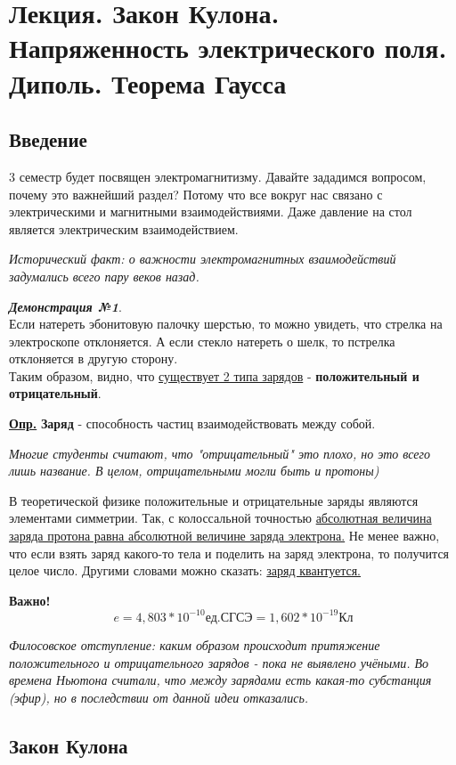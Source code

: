 \newpage
\section{Лекция. Закон Кулона. Напряженность электрического поля. Диполь. Теорема Гаусса}
\subsection{Введение}
3 семестр будет посвящен электромагнитизму. Давайте зададимся вопросом, почему это важнейший раздел? Потому что все вокруг нас связано с электрическими и магнитными взаимодействиями. Даже давление на стол является электрическим взаимодействием. 

\textit{Исторический факт: о важности электромагнитных взаимодействий задумались всего пару веков назад.}

\large
\textbf{\textit{Демонстрация №1}}.\\
\normalsize
Если натереть эбонитовую палочку шерстью, то можно увидеть, что стрелка на электроскопе отклоняется. А если стекло натереть о шелк, то пстрелка отклоняется в другую сторону.\\
Таким образом, видно, что \underline{существует 2 типа зарядов} - \textbf{положительный и отрицательный}.

\colorbox{faded}{\underline{\textbf{Опр.}}} \textbf{Заряд} - способность частиц взаимодействовать между собой.

\textit{Многие студенты считают, что "отрицательный" это плохо, но это всего лишь название. В целом, отрицательными могли быть и протоны)}

В теоретической физике положительные и отрицательные заряды являются элементами симметрии. Так, с колоссальной точностью \underline{абсолютная величина заряда протона равна абсолютной величине заряда электрона.} Не менее важно, что если взять заряд какого-то тела и поделить на заряд электрона, то получится целое число. Другими словами можно сказать: \underline{заряд квантуется.}

\textbf{Важно!} 
$$e = 4,803*10^{-10} \text{ед.СГСЭ} = 1,602*10^{-19} \text{Кл}$$

\textit{Филосовское отступление: каким образом происходит притяжение положительного и отрицательного зарядов - пока не выявлено учёными. Во времена Ньютона считали, что между зарядами есть какая-то субстанция (эфир), но в последствии от данной идеи отказались.}

\newpage

\subsection{Закон Кулона}

